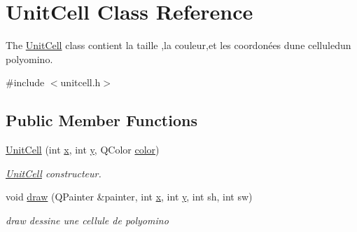 \hypertarget{class_unit_cell}{}\section{Unit\+Cell Class Reference}
\label{class_unit_cell}


The \hyperlink{class_unit_cell}{Unit\+Cell} class contient la taille ,la couleur,et les coordonées d\textquotesingle{}une celluled\textquotesingle{}un polyomino.  




{\ttfamily \#include $<$unitcell.\+h$>$}

\subsection*{Public Member Functions}
\begin{DoxyCompactItemize}
\item 
\hyperlink{class_unit_cell_a5dbf3b36af02e1ea1957c93b79ba8099}{Unit\+Cell} (int \hyperlink{class_unit_cell_aae64c4e864e786746eba53443f946d69}{x}, int \hyperlink{class_unit_cell_a9fdd4a78e21c23d47e535ed2510002ad}{y}, Q\+Color \hyperlink{class_unit_cell_a6e7907cda650addf06f7f06c690180de}{color})
\begin{DoxyCompactList}\small\item\em \hyperlink{class_unit_cell}{Unit\+Cell} constructeur. \end{DoxyCompactList}\item 
void \hyperlink{class_unit_cell_a903afaf6948b87afd78cc971674b60cd}{draw} (Q\+Painter \&painter, int \hyperlink{class_unit_cell_aae64c4e864e786746eba53443f946d69}{x}, int \hyperlink{class_unit_cell_a9fdd4a78e21c23d47e535ed2510002ad}{y}, int sh, int sw)
\begin{DoxyCompactList}\small\item\em draw dessine une cellule de polyomino \end{DoxyCompactList}\end{DoxyCompactItemize}

